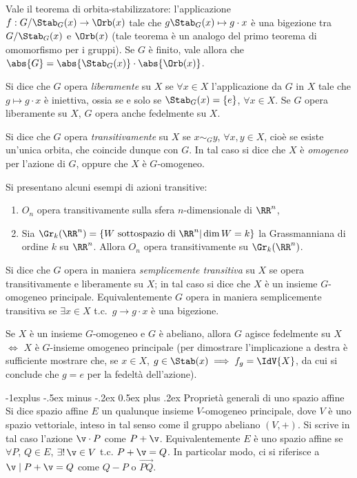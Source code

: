 \documentclass[10pt,landscape]{article}
\makeatletter
\renewcommand{\subsection}{\@startsection{subsection}{2}{0mm}%
	{-1explus -.5ex minus -.2ex}%
	{0.5ex plus .2ex}%
	{\normalfont\normalsize\bfseries}}
\makeatother
\begin{document}
\begin{multicols}{3}
		Vale il teorema di orbita-stabilizzatore: l'applicazione $f:G/\Stab_G(x) \rightarrow \Orb(x)$ tale che $g \Stab_G(x) \mapsto g \cdot x$ è una bigezione tra
		$G/\Stab_G(x)$ e $\Orb(x)$ (tale teorema è un analogo del primo teorema di
		omomorfismo per i gruppi). Se $G$ è finito, vale allora che $\abs{G} = \abs{\Stab_G(x)} \cdot \abs{\Orb(x)}$.
		
		Si dice che $G$ opera \textit{liberamente} su $X$ se $\forall x \in X$ l'applicazione
		da $G$ in $X$ tale che $g \mapsto g \cdot x$ è iniettiva, ossia se e solo se $\Stab_G(x)=\{e\}$, $\forall x \in X$. Se $G$ opera liberamente su $X$,
		$G$ opera anche fedelmente su $X$.
		
		Si dice che $G$ opera \textit{transitivamente }su $X$ se $x \sim_G y$, $\forall x,y \in X$, cioè se esiste un'unica orbita, che coincide dunque con $G$. In tal caso
		si dice che $X$ è \textit{omogeneo} per l'azione di $G$, oppure che
		$X$ è $G$-omogeneo.
		
		Si presentano alcuni esempi di azioni transitive:
		\begin{enumerate}
			\item $O_n$ opera transitivamente sulla sfera $n$-dimensionale di $\RR^n$,
			\item Sia $\Gr_k(\RR^n)=\{W \text{ sottospazio di } \RR^n | \dim W=k\}$ la Grassmanniana di ordine $k$ su $\RR^n$. Allora $O_n$ opera transitivamente su $\Gr_k(\RR^n)$.
		\end{enumerate}
		
		Si dice che $G$ opera in maniera \textit{semplicemente transitiva} su $X$ se opera transitivamente e liberamente su $X$; in tal caso si dice che $X$ è un insieme $G$-omogeneo principale. Equivalentemente $G$ opera in maniera semplicemente transitiva se $\exists x\in X$ t.c.~$g\rightarrow g \cdot x$ è una bigezione.
		
		Se $X$ è un insieme $G$-omogeneo e $G$ è abeliano, allora $G$ agisce fedelmente su $X$ $\iff$ $X$ è $G$-insieme omogeneo principale (per dimostrare l'implicazione a destra è sufficiente mostrare che, se $x \in X$, $g \in \Stab(x) \implies f_g = \IdV{X}$, da cui si conclude
		che $g = e$ per la fedeltà dell'azione).
		
		\subsection{Proprietà generali di uno spazio affine}
		Si dice spazio affine $E$ un qualunque insieme $V$-omogeneo principale, dove
		$V$ è uno spazio vettoriale, inteso in tal senso come il gruppo abeliano
		$(V, +)$. Si scrive in tal caso l'azione $\v \cdot P$ come $P + \v$. Equivalentemente $E$ è uno spazio affine se $\forall P$, $Q \in E$, $\exists! \, \v\in V$ t.c. $P + \v = Q$. In particolar modo, ci si riferisce a $\v \mid P + \v = Q$ come $Q - P$ o
		$\overrightarrow{PQ}$.
		

\end{multicols}
\end{document}
